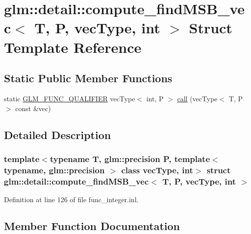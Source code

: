 \hypertarget{structglm_1_1detail_1_1compute__find_m_s_b__vec}{}\section{glm\+::detail\+::compute\+\_\+find\+M\+S\+B\+\_\+vec$<$ T, P, vec\+Type, int $>$ Struct Template Reference}
\label{structglm_1_1detail_1_1compute__find_m_s_b__vec}
\subsection*{Static Public Member Functions}
\begin{DoxyCompactItemize}
\item 
static \mbox{\hyperlink{setup_8hpp_a33fdea6f91c5f834105f7415e2a64407}{G\+L\+M\+\_\+\+F\+U\+N\+C\+\_\+\+Q\+U\+A\+L\+I\+F\+I\+ER}} vec\+Type$<$ int, P $>$ \mbox{\hyperlink{structglm_1_1detail_1_1compute__find_m_s_b__vec_a9ea90d2230763f80ab30465fc3a73a65}{call}} (vec\+Type$<$ T, P $>$ const \&vec)
\end{DoxyCompactItemize}


\subsection{Detailed Description}
\subsubsection*{template$<$typename T, glm\+::precision P, template$<$ typename, glm\+::precision $>$ class vec\+Type, int$>$\newline
struct glm\+::detail\+::compute\+\_\+find\+M\+S\+B\+\_\+vec$<$ T, P, vec\+Type, int $>$}



Definition at line 126 of file func\+\_\+integer.\+inl.



\subsection{Member Function Documentation}
\mbox{\label{structglm_1_1detail_1_1compute__find_m_s_b__vec_a9ea90d2230763f80ab30465fc3a73a65}} 

